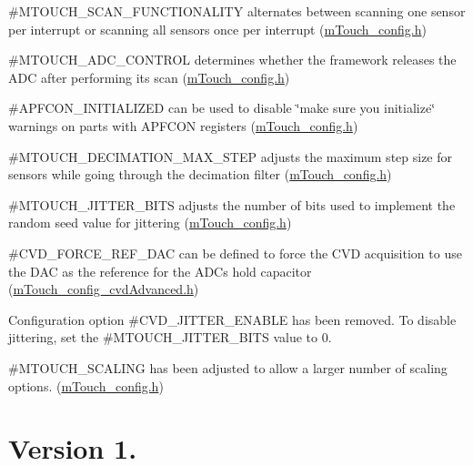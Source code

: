 \begin{DoxyItemize}
\begin{DoxyItemize}
\item \#\+M\+T\+O\+U\+C\+H\+\_\+\+S\+C\+A\+N\+\_\+\+F\+U\+N\+C\+T\+I\+O\+N\+A\+L\+I\+T\+Y alternates between scanning one sensor per interrupt or scanning all sensors once per interrupt (\hyperlink{m_touch__config_8h}{m\+Touch\+\_\+config.\+h}) 
\item \#\+M\+T\+O\+U\+C\+H\+\_\+\+A\+D\+C\+\_\+\+C\+O\+N\+T\+R\+O\+L determines whether the framework releases the A\+D\+C after performing its scan (\hyperlink{m_touch__config_8h}{m\+Touch\+\_\+config.\+h}) 
\item \#\+A\+P\+F\+C\+O\+N\+\_\+\+I\+N\+I\+T\+I\+A\+L\+I\+Z\+E\+D can be used to disable \char`\"{}make sure you initialize\char`\"{} warnings on parts with A\+P\+F\+C\+O\+N registers (\hyperlink{m_touch__config_8h}{m\+Touch\+\_\+config.\+h}) 
\item \#\+M\+T\+O\+U\+C\+H\+\_\+\+D\+E\+C\+I\+M\+A\+T\+I\+O\+N\+\_\+\+M\+A\+X\+\_\+\+S\+T\+E\+P adjusts the maximum step size for sensors while going through the decimation filter (\hyperlink{m_touch__config_8h}{m\+Touch\+\_\+config.\+h}) 
\item \#\+M\+T\+O\+U\+C\+H\+\_\+\+J\+I\+T\+T\+E\+R\+\_\+\+B\+I\+T\+S adjusts the number of bits used to implement the random seed value for jittering (\hyperlink{m_touch__config_8h}{m\+Touch\+\_\+config.\+h}) 
\item \#\+C\+V\+D\+\_\+\+F\+O\+R\+C\+E\+\_\+\+R\+E\+F\+\_\+\+D\+A\+C can be defined to force the C\+V\+D acquisition to use the D\+A\+C as the reference for the A\+D\+C\textquotesingle{}s hold capacitor (\hyperlink{m_touch__config__cvd_advanced_8h}{m\+Touch\+\_\+config\+\_\+cvd\+Advanced.\+h}) 
\end{DoxyItemize}\item Configuration option \#\+C\+V\+D\+\_\+\+J\+I\+T\+T\+E\+R\+\_\+\+E\+N\+A\+B\+L\+E has been removed. To disable jittering, set the \#\+M\+T\+O\+U\+C\+H\+\_\+\+J\+I\+T\+T\+E\+R\+\_\+\+B\+I\+T\+S value to 0. \item \#\+M\+T\+O\+U\+C\+H\+\_\+\+S\+C\+A\+L\+I\+N\+G has been adjusted to allow a larger number of scaling options. (\hyperlink{m_touch__config_8h}{m\+Touch\+\_\+config.\+h})\end{DoxyItemize}
\hypertarget{_changelog_cl0101}{}\section{Version 1.}\label{_changelog_cl0101}
